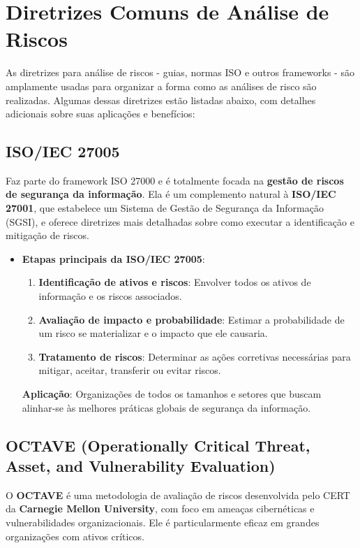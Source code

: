 \documentclass[12pt,oneside,a4paper,article]{abntex2}
\begin{document}
\setcounter{section}{0}
\section{Diretrizes Comuns de Análise de Riscos}

As diretrizes para análise de riscos - guias, normas ISO e outros frameworks - são amplamente usadas para organizar a forma como as análises de risco são realizadas. Algumas dessas diretrizes estão listadas abaixo, com detalhes adicionais sobre suas aplicações e benefícios:

\subsection{ISO/IEC 27005}

Faz parte do framework ISO 27000 e é totalmente focada na \textbf{gestão de riscos de segurança da informação}. Ela é um complemento natural à \textbf{ISO/IEC 27001}, que estabelece um Sistema de Gestão de Segurança da Informação (SGSI), e oferece diretrizes mais detalhadas sobre como executar a identificação e mitigação de riscos.

\begin{itemize}
    \item \textbf{Etapas principais da ISO/IEC 27005}:
    \begin{enumerate}
        \item \textbf{Identificação de ativos e riscos}: Envolver todos os ativos de informação e os riscos associados.
        \item \textbf{Avaliação de impacto e probabilidade}: Estimar a probabilidade de um risco se materializar e o impacto que ele causaria.
        \item \textbf{Tratamento de riscos}: Determinar as ações corretivas necessárias para mitigar, aceitar, transferir ou evitar riscos.
    \end{enumerate}
    \textbf{Aplicação}: Organizações de todos os tamanhos e setores que buscam alinhar-se às melhores práticas globais de segurança da informação.
\end{itemize}

\subsection{OCTAVE (Operationally Critical Threat, Asset, and Vulnerability Evaluation)}

O \textbf{OCTAVE} é uma metodologia de avaliação de riscos desenvolvida pelo CERT da \textbf{Carnegie Mellon University}, com foco em ameaças cibernéticas e vulnerabilidades organizacionais. Ele é particularmente eficaz em grandes organizações com ativos críticos.
\end{document}
